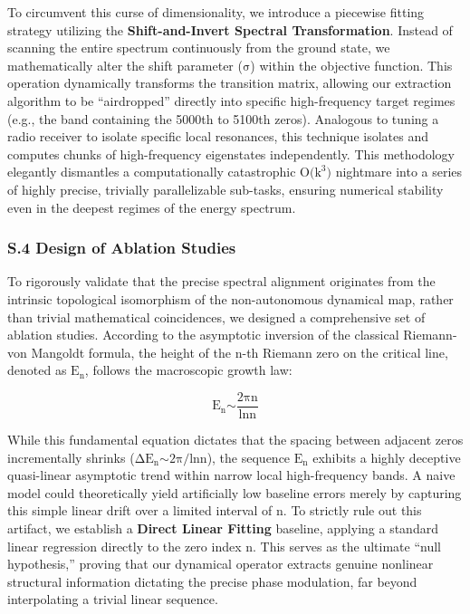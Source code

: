 To circumvent this curse of dimensionality, we introduce a piecewise
fitting strategy utilizing the \textbf{Shift-and-Invert Spectral
Transformation}. Instead of scanning the entire spectrum continuously
from the ground state, we mathematically alter the shift parameter
(\(\text{σ}\)) within the objective function. This operation dynamically
transforms the transition matrix, allowing our extraction algorithm to
be ``airdropped'' directly into specific high-frequency target regimes
(e.g., the band containing the 5000th to 5100th zeros). Analogous to
tuning a radio receiver to isolate specific local resonances, this
technique isolates and computes chunks of high-frequency eigenstates
independently. This methodology elegantly dismantles a computationally
catastrophic \(\text{O}\text{(}\text{k}^{\text{3}}\text{)}\) nightmare
into a series of highly precise, trivially parallelizable sub-tasks,
ensuring numerical stability even in the deepest regimes of the energy
spectrum.

\hypertarget{s.4-design-of-ablation-studies}{%
\subsubsection{\texorpdfstring{\textbf{S.4 Design of Ablation
Studies}}{S.4 Design of Ablation Studies}}\label{s.4-design-of-ablation-studies}}

To rigorously validate that the precise spectral alignment originates
from the intrinsic topological isomorphism of the non-autonomous
dynamical map, rather than trivial mathematical coincidences, we
designed a comprehensive set of ablation studies. According to the
asymptotic inversion of the classical Riemann-von Mangoldt formula, the
height of the \(\text{n}\)-th Riemann zero on the critical line, denoted
as \(\text{E}_{\text{n}}\), follows the macroscopic growth law:

\[\text{E}_{\text{n}}\text{∼}\frac{\text{2}\text{πn}}{\text{ln}\text{n}}\]

While this fundamental equation dictates that the spacing between
adjacent zeros incrementally shrinks
(\(\text{Δ}\text{E}_{\text{n}}\text{∼2}\text{π}\text{/ln}\text{n}\)),
the sequence \(\text{E}_{\text{n}}\) exhibits a highly deceptive
quasi-linear asymptotic trend within narrow local high-frequency bands.
A naive model could theoretically yield artificially low baseline errors
merely by capturing this simple linear drift over a limited interval of
\(\text{n}\). To strictly rule out this artifact, we establish a
\textbf{Direct Linear Fitting} baseline, applying a standard linear
regression directly to the zero index \(\text{n}\). This serves as the
ultimate ``null hypothesis,'' proving that our dynamical operator
extracts genuine nonlinear structural information dictating the precise
phase modulation, far beyond interpolating a trivial linear sequence.

